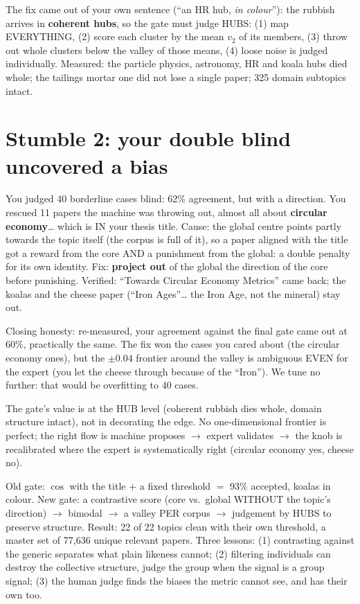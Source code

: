 \documentclass[11pt,a4paper]{article}
\begin{document}
The fix came out of your own sentence (``an HR hub, \emph{in colour}''): the rubbish arrives in
\textbf{coherent hubs}, so the gate must judge HUBS: (1) map EVERYTHING, (2) score each cluster
by the mean $v_2$ of its members, (3) throw out whole clusters below the valley of those means,
(4) loose noise is judged individually. Measured: the particle physics, astronomy, HR and koala
hubs died whole; the tailings mortar one did not lose a single paper; 325 domain subtopics
intact.

\section{Stumble 2: your double blind uncovered a bias}

You judged 40 borderline cases blind: 62\% agreement, but with a direction. You rescued 11
papers the machine was throwing out, almost all about \textbf{circular economy}\ldots{} which is
IN your thesis title. Cause: the global centre points partly towards the topic itself (the
corpus is full of it), so a paper aligned with the title got a reward from the core AND a
punishment from the global: a double penalty for its own identity. Fix: \textbf{project out} of
the global the direction of the core before punishing. Verified: ``Towards Circular Economy
Metrics'' came back; the koalas and the cheese paper (``Iron Ages''\ldots{} the Iron Age, not the
mineral) stay out.

Closing honesty: re-measured, your agreement against the final gate came out at 60\%,
practically the same. The fix won the cases you cared about (the circular economy ones), but the
$\pm0.04$ frontier around the valley is ambiguous EVEN for the expert (you let the cheese
through because of the ``Iron''). We tune no further: that would be overfitting to 40 cases.

\begin{ojo}
The gate's value is at the HUB level (coherent rubbish dies whole, domain structure intact), not
in decorating the edge. No one-dimensional frontier is perfect; the right flow is machine
proposes $\to$ expert validates $\to$ the knob is recalibrated where the expert is
systematically right (circular economy yes, cheese no).
\end{ojo}

\begin{resumen}
Old gate: $\cos$ with the title $+$ a fixed threshold $=$ 93\% accepted, koalas in colour.
New gate: a contrastive score (core vs.\ global WITHOUT the topic's direction) $\to$ bimodal
$\to$ a valley PER corpus $\to$ judgement by HUBS to preserve structure. Result: 22 of 22
topics clean with their own threshold, a master set of 77,636 unique relevant papers. Three
lessons: (1) contrasting against the generic separates what plain likeness cannot; (2) filtering
individuals can destroy the collective structure, judge the group when the signal is a group
signal; (3) the human judge finds the biases the metric cannot see, and has their own too.
\end{resumen}
\end{document}

